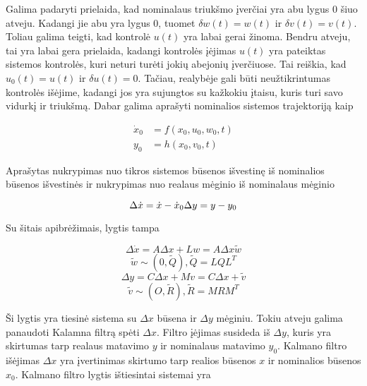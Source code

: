     Galima padaryti prielaida, kad nominalaus triukšmo įverčiai yra abu lygus 0 šiuo atveju.
    Kadangi jie abu yra lygus 0, tuomet $\delta w(t) = w(t)$ ir $\delta v(t) = v(t)$.
    Toliau galima teigti, kad kontrolė $u(t)$ yra labai gerai žinoma.
    Bendru atveju, tai yra labai gera prielaida, kadangi kontrolės įėjimas $u(t)$ yra pateiktas sistemos kontrolės, kuri neturi turėti jokių abejonių įverčiuose.
    Tai reiškia, kad $u_0(t) = u(t)$ ir $\delta u(t) = 0$.
    Tačiau, realybėje gali būti neužtikrintumas kontrolės išėjime, kadangi jos yra sujungtos su kažkokiu įtaisu, kuris turi savo vidurkį ir triukšmą.
    Dabar galima aprašyti nominalios sistemos trajektoriją kaip

    \begin{equation}
        \label{eq:nominal_sistem_trajektory}
        \begin{aligned}
            \dot{x}_0 &= f(x_0, u_0, w_0, t) \\
            y_0 &= h(x_0, v_0, t)
        \end{aligned}
    \end{equation}

    Aprašytas nukrypimas nuo tikros sistemos būsenos išvestinę iš nominalios būsenos išvestinės ir nukrypimas nuo realaus mėginio iš nominalaus mėginio

    \begin{equation}
        \Delta \dot{x} = \dot{x} - \dot{x}_0 \\
        \Delta y = y - y_0
    \end{equation}

    Su šitais apibrėžimais, lygtis tampa

    \begin{equation}
        \Delta \dot{x} = A \Delta x + Lw = A \Delta x \tilde{w}
    \end{equation}
    \begin{equation}
        \tilde{w} \sim (0, \tilde{Q}), \tilde{Q} = LQL^T
    \end{equation}
    \begin{equation}
        \Delta y = C \Delta x + Mv = C \Delta x + \tilde{v}
    \end{equation}
    \begin{equation}
        \tilde{v} \sim (O, \tilde{R}), \tilde{R} = MRM^T
    \end{equation}

    Ši lygtis yra tiesinė sistema su $\Delta x$ būsena ir $\Delta y$ mėginiu.
    Tokiu atveju galima panaudoti Kalamna filtrą spėti $\Delta x$.
    Filtro įėjimas susideda iš $\Delta y$, kuris yra skirtumas tarp realaus matavimo $y$ ir nominalaus matavimo $y_0$.
    Kalmano filtro išėjimas $\Delta x$ yra įvertinimas skirtumo tarp realios būsenos $x$ ir nominalios būsenos $x_0$.
    Kalmano filtro lygtis ištiesintai sistemai yra

